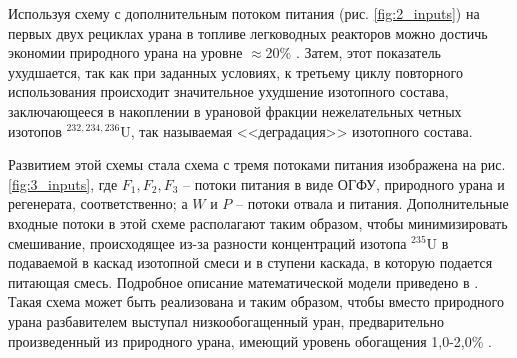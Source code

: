 
Используя схему с дополнительным потоком питания (рис. \ref{fig:2_inputs}) на первых двух рециклах урана в топливе легководных реакторов можно достичь экономии природного урана на уровне $\approx$20\% \cite{smirnovApplyingEnrichmentCapacities2018}. Затем, этот показатель ухудшается, так как при заданных условиях, к третьему циклу повторного использования происходит значительное ухудшение изотопного состава, заключающееся в накоплении в урановой фракции нежелательных четных изотопов $^{232,234,236}$U, так называемая <<деградация>> изотопного состава.


Развитием этой схемы стала схема с тремя потоками питания изображена на рис. \ref{fig:3_inputs}, где $F_{1}, F_{2}, F_{3}$ -- потоки питания в виде ОГФУ, природного урана и регенерата, соответственно; а $W$ и $P$ -- потоки отвала и питания. Дополнительные входные потоки в этой схеме располагают таким образом, чтобы минимизировать смешивание, происходящее из-за разности концентраций изотопа $^{235}$U в подаваемой в каскад изотопной смеси и в ступени каскада, в которую подается питающая смесь. Подробное описание математической модели приведено в \cite{smirnovEnrichmentRegeneratedUranium2014}. Такая схема может быть реализована и таким образом, чтобы вместо природного урана разбавителем выступал низкообогащенный уран, предварительно произведенный из природного урана, имеющий уровень обогащения 1,0-2,0\% \cite{smirnovDilutionRecycledUranium2015}. 

